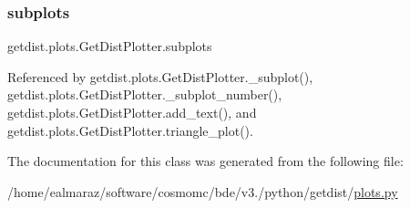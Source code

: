 \subsubsection{\texorpdfstring{subplots}{subplots}}
{\footnotesize\ttfamily getdist.\+plots.\+Get\+Dist\+Plotter.\+subplots}



Referenced by getdist.\+plots.\+Get\+Dist\+Plotter.\+\_\+subplot(), getdist.\+plots.\+Get\+Dist\+Plotter.\+\_\+subplot\+\_\+number(), getdist.\+plots.\+Get\+Dist\+Plotter.\+add\+\_\+text(), and getdist.\+plots.\+Get\+Dist\+Plotter.\+triangle\+\_\+plot().



The documentation for this class was generated from the following file\+:\begin{DoxyCompactItemize}
\item 
/home/ealmaraz/software/cosmomc/bde/v3./python/getdist/\mbox{\hyperlink{plots_8py}{plots.\+py}}\end{DoxyCompactItemize}
